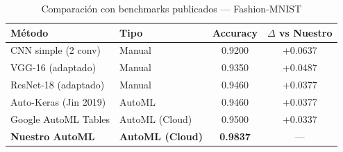 \begin{table}[htbp]
\centering
\caption{Comparación con benchmarks publicados — Fashion-MNIST}
\label{tab:benchmark_fashion_mnist}
\begin{tabular}{llcc}
\toprule
\textbf{Método} & \textbf{Tipo} & \textbf{Accuracy} & \textbf{$\Delta$ vs Nuestro} \\
\midrule
  CNN simple (2 conv) & Manual & 0.9200 & +0.0637 \\
  VGG-16 (adaptado) & Manual & 0.9350 & +0.0487 \\
  ResNet-18 (adaptado) & Manual & 0.9460 & +0.0377 \\
  Auto-Keras (Jin 2019) & AutoML & 0.9460 & +0.0377 \\
  Google AutoML Tables & AutoML (Cloud) & 0.9500 & +0.0337 \\
\midrule
  \textbf{Nuestro AutoML} & \textbf{AutoML (Cloud)} & \textbf{0.9837} & --- \\
\bottomrule
\end{tabular}
\end{table}